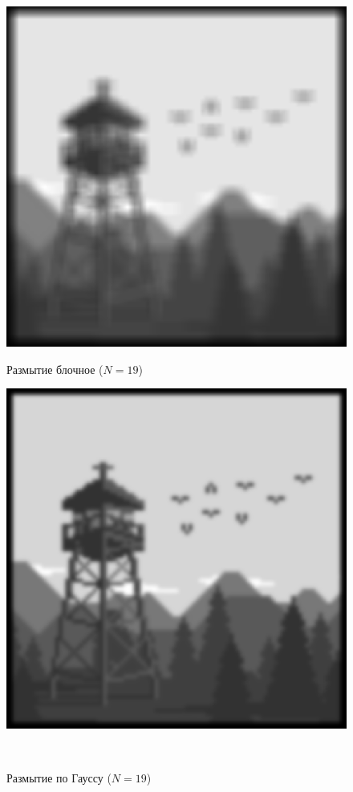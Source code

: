 \documentclass[a4paper]{article}
\begin{document}
\begin{figure}[H]
    \begin{minipage}{0.49\textwidth}
        \centering \includegraphics[width=\textwidth]{2/19_img_block_by_conv2.png}
        \caption{Размытие блочное ($N = 19$)}
    \end{minipage}\hfill
    \begin{minipage}{0.49\textwidth}
        \centering \includegraphics[width=\textwidth]{2/19_img_gaussian_by_conv2.png}
        \caption{Размытие по Гауссу ($N = 19$)}
    \end{minipage}\\[1em]
\end{figure}\noindent\
\end{document}
